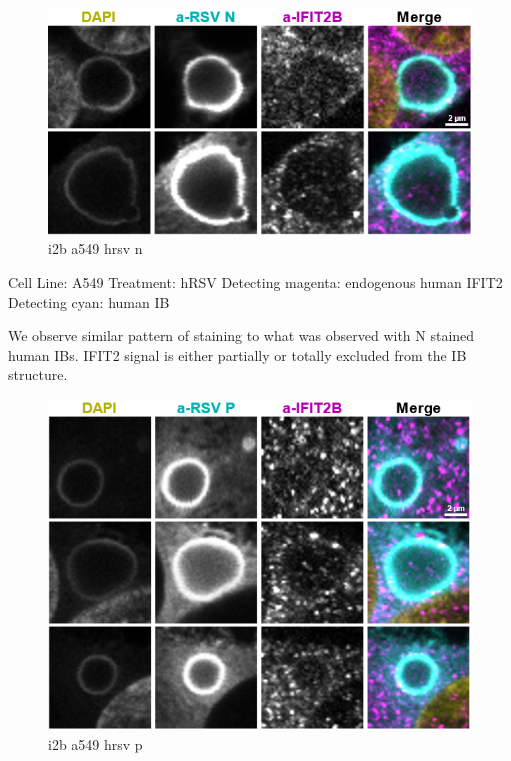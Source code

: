 \begin{figure}
    \centering
    \includegraphics[width=1\linewidth]{09. Chapter 4//Figs//02. I2B/03. i2b a549 hrsv n.png}
    \caption[i2b a549 hrsv n]{i2b a549 hrsv n}
    \label{i2b a549 hrsv n}
\end{figure}

Cell Line: A549 \newline
Treatment: hRSV \newline
Detecting magenta: endogenous human IFIT2  \newline
Detecting cyan: human IB  \newline

We observe similar pattern of staining to what was observed with N stained human IBs. IFIT2 signal is either partially or totally excluded from the IB structure.

\begin{figure}
    \centering
    \includegraphics[width=1\linewidth]{09. Chapter 4//Figs//02. I2B/04. i2b a549 hrsv p.png}
    \caption[i2b a549 hrsv p]{i2b a549 hrsv p}
    \label{i2b a549 hrsv p}
\end{figure}

